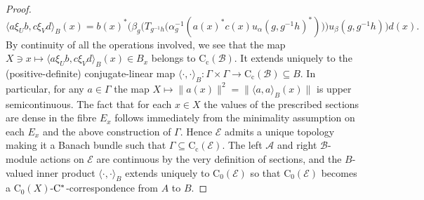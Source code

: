 \documentclass[11 pt, leqno]{amsart}
\numberwithin{equation}{section}
\theoremstyle{plain}
\theoremstyle{definition}
\newcommand*{\contc}{\mathrm{C_c}}%
\newcommand*{\contz}{\mathrm{C_0}}%
\newcommand{\B}{\mathcal B}
\newcommand{\EE}{\mathcal E}
\newcommand{\A}{\mathcal A}
\newcommand{\cst}{\ifmmode\mathrm{C}^*\else{$\mathrm{C}^*$}\fi}
\begin{document}
\begin{proof}
\[
    \langle a\xi_U b, c \xi_V d\rangle_{B} (x) = b(x)^* \Big( \beta_{g} \Big(T_{g^{-1} h} \big( \alpha_g^{-1}( a(x)^* c(x)u_{\alpha}(g,g^{-1}h)^*) \big) \Big)u_{\beta}(g,g^{-1}h)\Big) d(x). 
\]
By continuity of all the operations involved, we see that the map $X\ni x\mapsto \langle a\xi_U b, c \xi_V d\rangle_{B} (x) \in B_x$ belongs to $\contc(\B)$. 
It extends uniquely to the (positive-definite) conjugate-linear map $\langle \cdot, \cdot \rangle_{B}:\Gamma\times \Gamma \to \contc(\B)\subseteq B$. 
In particular, for any $a\in \Gamma$ the map $X\mapsto \|a(x)\|^2=\|\langle a, a \rangle_{B}(x)\|$ is upper semicontinuous.
The fact that for each $x \in X$ the values of the prescribed sections are dense in the fibre $E_x$ follows immediately from the minimality assumption on each $E_x$ and the above construction of $\Gamma$.
Hence $\EE$ admits a unique topology making it a Banach bundle  such that $\Gamma\subseteq \contc(\EE)$.
The left $\A$ and right $\B$-module actions on $\EE$ are continuous by the very definition of sections, and the $B$-valued inner product $\langle \cdot, \cdot \rangle_{B}$ extends uniquely to $\contz(\EE)$ so that $\contz(\EE)$ becomes a $\contz(X)$-$\cst$-correspondence from $A$ to $B$. 


\end{proof}
\end{document}
